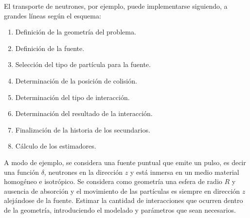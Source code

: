 El transporte de neutrones, por ejemplo, puede implementarse siguiendo, a grandes l\'ineas seg\'un el esquema:

\begin{enumerate}
 \item Definici\'on de la geometr\'ia del problema.
 \item Definici\'on de la fuente.
 \item Selecci\'on del tipo de part\'icula para la fuente.
 \item Determinaci\'on de la posici\'on de colisi\'on.
 \item Determinaci\'on del tipo de interacci\'on.
 \item Determinaci\'on del resultado de la interacci\'on.
 \item Finalizaci\'on de la historia de los secundarios.
 \item C\'alculo de los estimadores.
\end{enumerate}

A modo de ejemplo, se considera una fuente puntual que emite un pulso, es decir una funci\'on $\delta$, neutrones en la direcci\'on $z$ y
est\'a inmersa en un medio material homog\'eneo e isotr\'opico. Se considera como geometr\'ia una esfera de radio $R$ y ausencia de
absorci\'on y el movimiento de las part\'iculas es siempre en direcci\'on $z$ alej\'andose de la fuente. Estimar
la cantidad de interacciones que ocurren dentro de la geometr\'ia, introduciendo el modelado y par\'ametros que sean necesarios.
